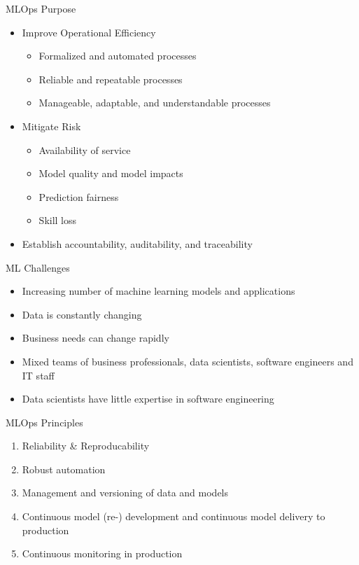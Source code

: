 \documentclass[ignorenonframetext,xcolor=x11names]{beamer}
\begin{document}
\begin{frame}{MLOps Purpose}
\begin{itemize}
\item Improve Operational Efficiency
    \begin{itemize}
        \item Formalized and automated processes
        \item Reliable and repeatable processes
        \item Manageable, adaptable, and understandable processes
    \end{itemize}
\item Mitigate Risk
	\begin{itemize}
	   \item Availability of service
	   \item Model quality and model impacts
	   \item Prediction fairness
	   \item Skill loss
	\end{itemize}
\item Establish accountability, auditability, and traceability
\end{itemize}
\end{frame}

\begin{frame}{ML Challenges}

\begin{itemize}
  \item Increasing number of machine learning models and applications
  \item Data is constantly changing
  \item Business needs can change rapidly
  \item Mixed teams of business professionals, data scientists, software engineers and IT staff
  \item Data scientists have little expertise in software engineering
\end{itemize}
\end{frame}

\begin{frame}{MLOps Principles}
\begin{enumerate}
  \item Reliability \& Reproducability
  \item Robust automation
  \item Management and versioning of data and models
  \item Continuous model (re-) development and continuous model delivery to production
  \item Continuous monitoring in production
\end{enumerate}
\end{frame}
\end{document}
